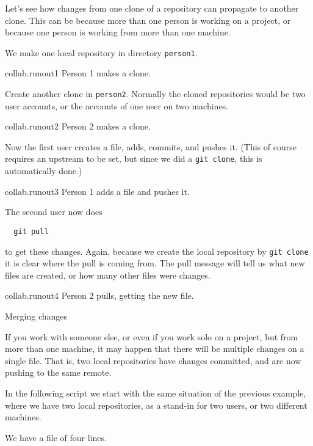 Let's see how changes from one clone of a repository
can propagate to another clone.
This can be because more than one person is working on a project,
or because one person is working from more than one machine.

We make one local repository in directory \lstinline{person1}.

\begin{gitstep}{collab.runout1}
  Person 1 makes a clone.
\end{gitstep}

Create another clone in \lstinline{person2}.
Normally the cloned repositories would be two user accounts,
or the accounts of one user on two machines.

\begin{gitstep}{collab.runout2}
  Person 2 makes a clone.
\end{gitstep}

Now the first user creates a file, adds, commits, and pushes it.
(This of course requires an upstream to be set,
but since we did a \lstinline{git clone},
this is automatically done.)

\begin{gitstep}{collab.runout3}
  Person 1 adds a file and pushes it.
\end{gitstep}

The second user now does
\begin{lstlisting}
  git pull
\end{lstlisting}
to get these changes.
Again, because we create the local repository by \lstinline{git clone}
it is clear where the pull is coming from.
The pull message will tell us what new files are created,
or how many other files were changes.

\begin{gitstep}{collab.runout4}
  Person 2 pulls, getting the new file.
\end{gitstep}

\newpage
{} {Merging changes}

If you work with someone else, or even if you work solo on a project,
but from more than one machine, it may happen that there will be multiple
changes on a single file. That is, two local repositories have changes committed,
and are now pushing to the same remote.

In the following script we start with the same situation of the previous example,
where we have two local repositories, as a stand-in for two users,
or two different machines.

We have a file of four lines.


